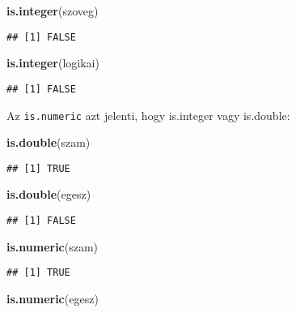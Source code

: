 \documentclass[]{book}
\newenvironment{Shaded}{\begin{snugshade}}{\end{snugshade}}
\newcommand{\KeywordTok}[1]{\textcolor[rgb]{0.13,0.29,0.53}{\textbf{#1}}}
\newcommand{\NormalTok}[1]{#1}
\begin{document}
\begin{Shaded}
\begin{Highlighting}[]
\KeywordTok{is.integer}\NormalTok{(szoveg)}
\end{Highlighting}
\end{Shaded}

\begin{verbatim}
## [1] FALSE
\end{verbatim}

\begin{Shaded}
\begin{Highlighting}[]
\KeywordTok{is.integer}\NormalTok{(logikai)}
\end{Highlighting}
\end{Shaded}

\begin{verbatim}
## [1] FALSE
\end{verbatim}

Az \texttt{is.numeric} azt jelenti, hogy is.integer vagy is.double:

\begin{Shaded}
\begin{Highlighting}[]
\KeywordTok{is.double}\NormalTok{(szam)}
\end{Highlighting}
\end{Shaded}

\begin{verbatim}
## [1] TRUE
\end{verbatim}

\begin{Shaded}
\begin{Highlighting}[]
\KeywordTok{is.double}\NormalTok{(egesz)}
\end{Highlighting}
\end{Shaded}

\begin{verbatim}
## [1] FALSE
\end{verbatim}

\begin{Shaded}
\begin{Highlighting}[]
\KeywordTok{is.numeric}\NormalTok{(szam)}
\end{Highlighting}
\end{Shaded}

\begin{verbatim}
## [1] TRUE
\end{verbatim}

\begin{Shaded}
\begin{Highlighting}[]
\KeywordTok{is.numeric}\NormalTok{(egesz)}
\end{Highlighting}
\end{Shaded}
\end{document}
